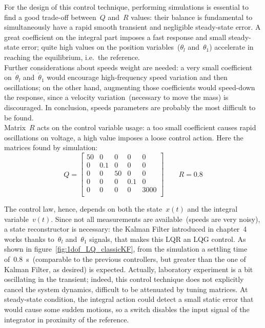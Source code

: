 For the design of this control technique, performing simulations is essential to find a good trade-off between~$Q$ and~$R$ values: their balance is fundamental to simultaneously have a rapid smooth transient and negligible steady-state error. A great coefficient on the integral part imposes a fast response and small steady-state error; quite high values on the position variables~($\theta_l$ and~$\theta_1$) accelerate in reaching the equilibrium, i.e.\ the reference. \\ Further considerations about speeds weight are needed: a very small coefficient on~$\dot \theta_l$ and~$\dot \theta_1$ would encourage high-frequency speed variation and then oscillations; on the other hand, augmenting those coefficients would speed-down the response, since a velocity variation~(necessary to move the mass) is discouraged. In conclusion, speeds parameters are probably the most difficult to be found. \\ Matrix~$R$ acts on the control variable usage: a too small coefficient causes rapid oscillations on voltage, a high value imposes a loose control action.
Here the matrices found by simulation:
\begin{equation}
	Q =
	\begin{bmatrix}
		50 & 0 & 0 & 0 & 0 \\
		0 & 0.1 & 0 & 0 & 0 \\
		0 & 0 & 50 & 0 & 0 \\
		0 & 0 & 0 & 0.1 & 0 \\
		0 & 0 & 0 & 0 & 3000 \\
	\end{bmatrix}
	\qquad
	R = 0.8
\end{equation}

The control law, hence, depends on both the state~$x(t)$ and the integral variable~$v(t)$. Since not all measurements are available~(speeds are very noisy), a state reconstructor is necessary: the Kalman Filter introduced in chapter~4 works thanks to~$\theta_l$ and~$\theta_1$ signals, that makes this LQR an LQG control. As shown in figure~\ref{fig:1dof_LQ_classicKF}, from the simulation a settling time of~0.8~s~(comparable to the previous controllers, but greater than the one of Kalman Filter, as desired) is expected. Actually, laboratory experiment is a bit oscillating in the transient; indeed, this control technique does not explicitly cancel the system dynamics, difficult to be attenuated by tuning matrices. At steady-state condition, the integral action could detect a small static error that would cause some sudden motions, so a switch disables the input signal of the integrator in proximity of the reference.

